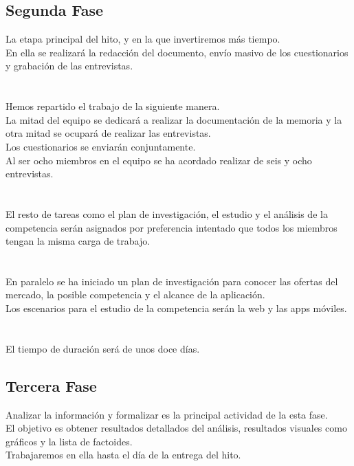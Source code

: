 \documentclass[12pt]{article}
\begin{document}
\subsection{Segunda Fase}
La etapa principal del hito, y en la que invertiremos más tiempo.\\ En ella se realizará la redacción del documento, envío masivo de los cuestionarios y grabación de las entrevistas.\\
\\
\\
Hemos repartido el trabajo de la siguiente manera.\\ La mitad del equipo se dedicará a realizar la documentación de la memoria y la otra mitad se ocupará de realizar las entrevistas.\\ Los cuestionarios se enviarán conjuntamente.\\ Al ser ocho miembros en el equipo se ha acordado realizar de seis y ocho entrevistas.\\
\\
\\
El resto de tareas como el plan de investigación, el estudio y el análisis de la competencia serán asignados por preferencia intentado que todos los miembros tengan la misma carga de trabajo.\\
\\
\\
En paralelo se ha iniciado un plan de investigación para conocer las ofertas del mercado, la posible competencia y el alcance de la aplicación.\\ Los escenarios para el estudio de la competencia serán la web y las apps móviles.\\
\\
\\
El tiempo de duración será de unos doce días.\\
\subsection{Tercera Fase}
Analizar la información y formalizar es la principal actividad de la esta fase.\\ \hspace{60pt}El objetivo es obtener resultados detallados del análisis, resultados visuales como gráficos y la lista de factoides.\\ Trabajaremos en ella hasta el día de la entrega del hito.\\
\end{document}
